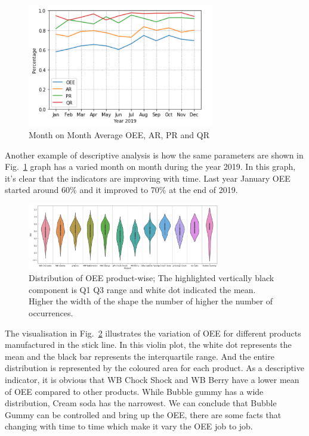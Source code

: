 \begin{figure}[ht]
  \begin{center}
  \includegraphics[width=3.2in]{photo/oee_entire_year.png}
  \caption{Month on Month Average OEE, AR, PR and QR}\label{OEEYear}
  \end{center}
\end{figure}

Another example of descriptive analysis is how the same parameters are shown in Fig.~\ref{OEEYear} graph has a varied month on month during the year 2019. In this graph, it’s clear that the indicators are improving with time. Last year January OEE started around 60\% and it improved to 70\% at the end of 2019. 

\begin{figure}[ht]
  \begin{center}
  \includegraphics[width=3.3in]{photo/violine.png}
  \caption{Distribution of OEE product-wise; The highlighted vertically black  component is Q1 Q3 range and white dot indicated the mean. Higher the width of the shape the number of higher the number of occurrences.}\label{ViolineOEE}
  \end{center}
\end{figure}

The visualisation in Fig.~\ref{ViolineOEE} illustrates the variation of OEE for different products manufactured in the stick line. In this violin plot, the white dot represents the mean and the black bar represents the interquartile range. And the entire distribution is represented by the coloured area for each product.  As a descriptive indicator, it is obvious that WB Chock Shock and WB Berry have a lower mean of OEE compared to other products. While Bubble gummy has a wide distribution, Cream soda has the narrowest. We can conclude that Bubble Gummy can be controlled and bring up the OEE, there are some facts that changing with time to time which make it vary the OEE job to job. \\

